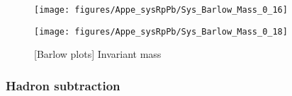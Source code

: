 \begin{itemize}
      \begin{figure}[H]
      \begin{minipage}{0.5\hsize} 
      \begin{center}
      \texttt{[image: figures/Appe\_sysRpPb/Sys\_Barlow\_Mass\_0\_16]}
      \end{center}
      \end{minipage}
      \begin{minipage}{0.5\hsize} 
      \begin{center}
      \texttt{[image: figures/Appe\_sysRpPb/Sys\_Barlow\_Mass\_0\_18]}
      \end{center}
      \end{minipage}
      \caption{[Barlow plots] Invariant mass}
      \label{fig:Sys_Mass}
      \end{figure}
      
  \end{itemize}
  
  
   \subsubsection{Hadron subtraction}
\label{subsub:appe_sys_RpPb_hadron}

